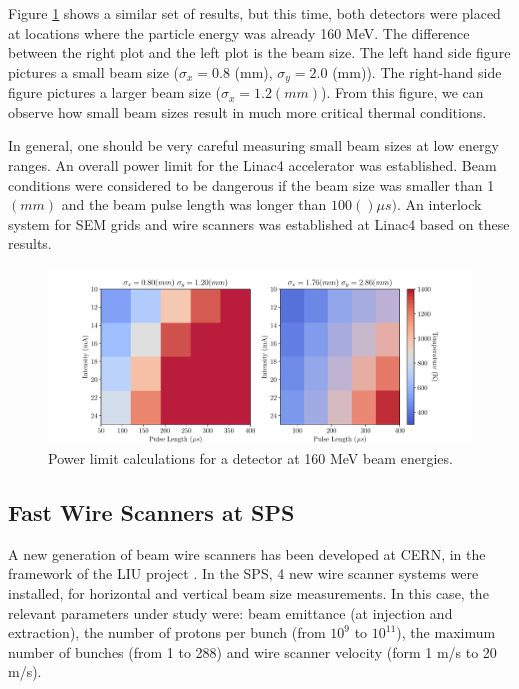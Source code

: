 Figure \ref{fig:SigmaComparison} shows a similar set of results, but this time, both detectors were placed at locations where the particle energy was already 160 MeV. The difference between the right plot and the left plot is the beam size. The left hand side figure pictures a small beam size ($\sigma_x = 0.8$ (mm), $\sigma_y = 2.0$ (mm)). The right-hand side figure pictures a larger beam size ($\sigma_x = 1.2 (mm)$). From this figure, we can observe how small beam sizes result in much more critical thermal conditions. 

In general, one should be very careful measuring small beam sizes at low energy ranges. An overall power limit for the Linac4 accelerator was established. Beam conditions were considered to be dangerous if the beam size was smaller than 1 $(mm)$ and the beam pulse length was longer than $100 ()\mu s)$. An interlock system for SEM grids and wire scanners was established at Linac4 based on these results. 

\begin{figure}[h]
    \centering
    \includegraphics[width=1.0\columnwidth]{Figure_ThermalLimitsSquares/SigmaCompa.pdf}
    \caption{Power limit calculations for a detector at 160 MeV beam energies.}
    \label{fig:SigmaComparison}
\end{figure}

\subsection{Fast Wire Scanners at SPS}

A new generation of beam wire scanners has been developed at CERN, in the framework of the LIU project \parencite[][]{ref:WireScanJose}. In the SPS, 4 new wire scanner systems were installed, for horizontal and vertical beam size measurements. In this case, the relevant parameters under study were: beam emittance (at injection and extraction), the number of protons per bunch (from $10^9$ to $10^{11}$), the maximum number of bunches (from 1 to 288) and wire scanner velocity (form 1 m/s to 20 m/s). 

